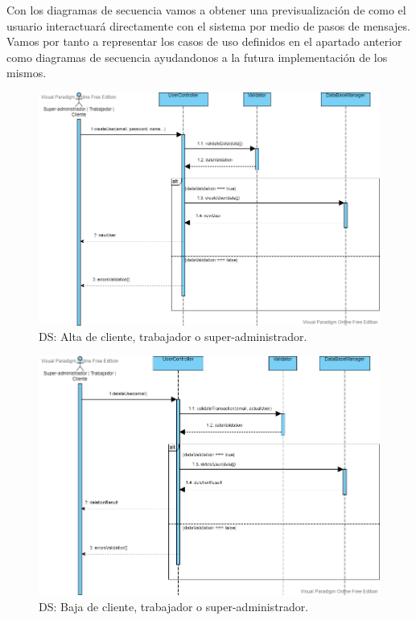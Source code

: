 Con los diagramas de secuencia vamos a obtener una previsualización de como el usuario interactuará directamente con el sistema por medio de pasos de mensajes. Vamos por tanto a representar los casos de uso definidos en el apartado anterior como diagramas de secuencia ayudandonos a la futura implementación de los mismos.

\begin{figure}[H]
  \centering
  \includegraphics[scale=0.42]{images/Alta_Usuario.png}
  \caption{DS: Alta de cliente, trabajador o super-administrador.}
  \label{DS1}
\end{figure}

\begin{figure}[H]
  \centering
  \includegraphics[scale=0.42]{images/Baja_Usuario.png}
  \caption{DS: Baja de cliente, trabajador o super-administrador.}
  \label{DS1}
\end{figure}

